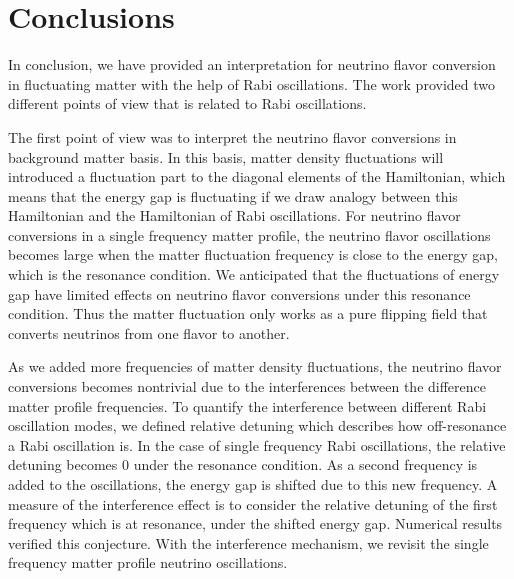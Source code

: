 



\section{\label{conclusions}Conclusions}



In conclusion, we have provided an interpretation for neutrino flavor conversion in fluctuating matter with the help of Rabi oscillations. The work provided two different points of view that is related to Rabi oscillations.

The first point of view was to interpret the neutrino flavor conversions in background matter basis. In this basis, matter density fluctuations will introduced a fluctuation part to the diagonal elements of the Hamiltonian, which means that the energy gap is fluctuating if we draw analogy between this Hamiltonian and the Hamiltonian of Rabi oscillations. For neutrino flavor conversions in a single frequency matter profile, the neutrino flavor oscillations becomes large when the matter fluctuation frequency is close to the energy gap, which is the resonance condition. We anticipated that the fluctuations of energy gap have limited effects on neutrino flavor conversions under this resonance condition. Thus the matter fluctuation only works as a pure flipping field that converts neutrinos from one flavor to another.

As we added more frequencies of matter density fluctuations, the neutrino flavor conversions becomes nontrivial due to the interferences between the difference matter profile frequencies. To quantify the interference between different Rabi oscillation modes, we defined relative detuning which describes how off-resonance a Rabi oscillation is. In the case of single frequency Rabi oscillations, the relative detuning becomes $0$ under the resonance condition. As a second frequency is added to the oscillations, the energy gap is shifted due to this new frequency. A measure of the interference effect is to consider the relative detuning of the first frequency which is at resonance, under the shifted energy gap. Numerical results verified this conjecture. With the interference mechanism, we revisit the single frequency matter profile neutrino oscillations.

